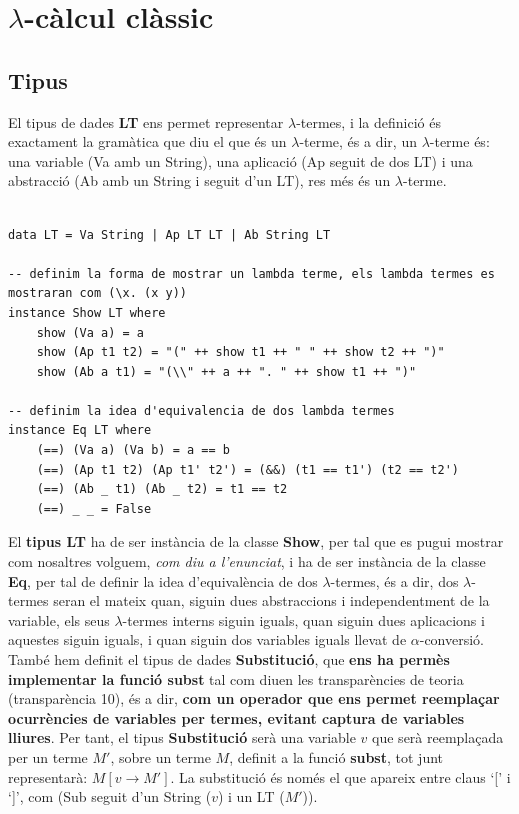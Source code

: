 \documentclass[10pt,a4paper]{article}
\begin{document}
\tableofcontents

\clearpage

\section{$\lambda$-càlcul clàssic}

\subsection{Tipus}

El tipus de dades \textbf{LT} ens permet representar $\lambda$-termes, i la definició és exactament la gramàtica que diu el que és un $\lambda$-terme, és a dir, un $\lambda$-terme és: una variable (Va amb un String), una aplicació (Ap seguit de dos LT) i una abstracció (Ab amb un String i seguit d'un LT), res més és un $\lambda$-terme.

\lstset{language=Haskell, breaklines=true, basicstyle=\footnotesize}
\begin{lstlisting}[frame=mystyle]

data LT = Va String | Ap LT LT | Ab String LT

-- definim la forma de mostrar un lambda terme, els lambda termes es mostraran com (\x. (x y))
instance Show LT where
    show (Va a) = a
    show (Ap t1 t2) = "(" ++ show t1 ++ " " ++ show t2 ++ ")"
    show (Ab a t1) = "(\\" ++ a ++ ". " ++ show t1 ++ ")"

-- definim la idea d'equivalencia de dos lambda termes
instance Eq LT where
    (==) (Va a) (Va b) = a == b
    (==) (Ap t1 t2) (Ap t1' t2') = (&&) (t1 == t1') (t2 == t2')
    (==) (Ab _ t1) (Ab _ t2) = t1 == t2
    (==) _ _ = False
\end{lstlisting}

El \textbf{tipus LT} ha de ser instància de la classe \textbf{Show}, per tal que es pugui mostrar com nosaltres volguem, \textit{com diu a l'enunciat}, i ha de ser instància de la classe \textbf{Eq}, per tal de definir la idea d'equivalència de dos $\lambda$-termes, és a dir, dos $\lambda$-termes seran el mateix quan, siguin dues abstraccions i independentment de la variable, els seus $\lambda$-termes interns siguin iguals, quan siguin dues aplicacions i aquestes siguin iguals, i quan siguin dos variables iguals llevat de $\alpha$-conversió. \\

També hem definit el tipus de dades \textbf{Substitució}, que \textbf{ens ha permès implementar la funció subst} tal com diuen les transparències de teoria (transparència 10), és a dir, \textbf{com un operador que ens permet reemplaçar ocurrències de variables per termes, evitant captura de variables lliures}. Per tant, el tipus \textbf{Substitució} serà una variable $v$ que serà reemplaçada per un terme $M'$, sobre un terme $M$, definit a la funció \textbf{subst}, tot junt representarà: $M [v \rightarrow M']$. La substitució és només el que apareix entre claus `[' i `]', com (Sub seguit d'un String ($v$) i un LT ($M'$)).
\end{document}
